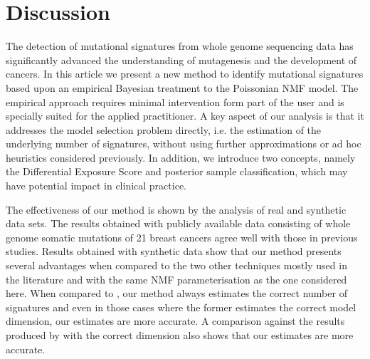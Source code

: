 \documentclass{bioinfo}
\begin{document}
\section{Discussion}
The detection of mutational signatures from whole genome sequencing 
data has significantly advanced the understanding of mutagenesis and
the development of cancers. In this article we present a new method to
identify mutational signatures based upon an empirical Bayesian
treatment to the Poissonian NMF model. The empirical approach requires
minimal intervention form part of the user and is specially suited for
the applied practitioner.  A key aspect of our analysis
is that it addresses the model selection problem directly,
i.e. the estimation of the underlying number of signatures, without
using further approximations or ad hoc heuristics considered
previously. In addition, we introduce two concepts, namely the
Differential Exposure Score and posterior sample classification, which
may have potential impact in clinical practice.


The effectiveness of our method is shown by the analysis of real and
synthetic data sets. The results obtained with publicly available
data consisting of whole genome somatic mutations of 21 breast
cancers agree well with those in previous studies. Results obtained
with synthetic data show that our method presents several advantages
when compared to the two other techniques mostly used in the
literature and with the same NMF parameterisation as the one
considered here. When compared to \cite{FICMV}, our
method always estimates the correct number of signatures and even in
those cases where the former estimates the correct model dimension,
our estimates are more accurate. A comparison against the results
produced by \cite{A} with the correct dimension also shows that
our estimates are more accurate.
\end{document}
